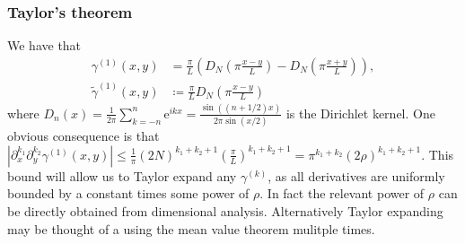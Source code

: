 \documentclass[a4paper,11pt]{article}
\newcommand{\euler}[1]{\text{e}^{#1}}
\newcommand{\abs}[1]{\left\lvert #1 \right\rvert}
\numberwithin{equation}{section}
\begin{document}
	\subsubsection{Taylor's theorem}
	We have that \begin{equation}
	\begin{aligned}
	\gamma^{(1)}(x,y)&=\frac{\pi}{L}\left(D_{N}\left(\pi\frac{x-y}{L}\right)-D_{N}\left(\pi\frac{x+y}{L}\right)\right),\\
	\tilde{\gamma}^{(1)}(x,y)&\coloneqq \frac{\pi}{L}D_{N}\left(\pi \frac{x-y}{L}\right)
	\end{aligned}
	\end{equation}
	where $ D_n(x)=\frac{1}{2\pi}\sum_{k=-n}^{n}\euler{ikx}=\frac{\sin((n+1/2)x)}{2\pi\sin(x/2)} $ is the Dirichlet kernel. One obvious consequence is that $ \abs{\partial_{x}^{k_1}\partial_{y}^{k_2}\gamma^{(1)}(x,y)}\leq \frac{1}{\pi}(2N)^{k_1+k_2+1}\left(\frac{\pi}{L}\right)^{k_1+k_2+1}=\pi^{k_1+k_2}(2\rho)^{k_1+k_2+1} $. This bound will allow us to Taylor expand any $ \gamma^{(k)} $, as all derivatives are uniformly bounded by a constant times some power of $ \rho $. In fact the relevant power of $ \rho $ can be directly obtained from dimensional analysis. Alternatively Taylor expanding may be thought of a using the mean value theorem mulitple times.
\end{document}
